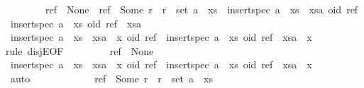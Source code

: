 \begin{isabellebody}
\ \ \ \ \ \ \ {}{\isacharcolon}\ {\isachardoublequoteopen}{\isacharparenleft}ref\ {\isacharequal}\ None\ {\isasymor}\ ref\ {\isacharequal}\ Some\ r\ {\isasymand}\ r\ {\isasymin}\ set\ {\isacharparenleft}a\ {\isacharhash}\ xs{\isacharparenright}\ {\isasymLongrightarrow}\ insert{\isacharunderscore}spec\ {\isacharparenleft}{\isacharparenleft}a\ {\isacharhash}\ xs{\isacharparenright}\ {\isacharat}\ xsa{\isacharparenright}\ {\isacharparenleft}oid{\isacharcomma}\ ref{\isacharparenright}\ {\isacharequal}\ insert{\isacharunderscore}spec\ {\isacharparenleft}a\ {\isacharhash}\ xs{\isacharparenright}\ {\isacharparenleft}oid{\isacharcomma}\ ref{\isacharparenright}\ {\isacharat}\ xsa{\isacharparenright}{\isachardoublequoteclose}\isanewline
\ \ \ \ \isamarkupfalse%
\ {\isachardoublequoteopen}insert{\isacharunderscore}spec\ {\isacharparenleft}{\isacharparenleft}a\ {\isacharhash}\ xs{\isacharparenright}\ {\isacharat}\ xsa\ {\isacharat}\ {\isacharbrackleft}x{\isacharbrackright}{\isacharparenright}\ {\isacharparenleft}oid{\isacharcomma}\ ref{\isacharparenright}\ {\isacharequal}\ insert{\isacharunderscore}spec\ {\isacharparenleft}a\ {\isacharhash}\ xs{\isacharparenright}\ {\isacharparenleft}oid{\isacharcomma}\ ref{\isacharparenright}\ {\isacharat}\ xsa\ {\isacharat}\ {\isacharbrackleft}x{\isacharbrackright}{\isachardoublequoteclose}\isanewline
\ \ \ \ \isamarkupfalse%
{\isacharparenleft}rule\ disjE{\isacharbrackleft}OF\ {}{\isacharbrackright}{\isacharparenright}\isanewline
\ \ \ \ \ \ \isamarkupfalse%
\ {\isachardoublequoteopen}ref\ {\isacharequal}\ None{\isachardoublequoteclose}\isanewline
\ \ \ \ \ \ \isamarkupfalse%
\ {\isachardoublequoteopen}insert{\isacharunderscore}spec\ {\isacharparenleft}{\isacharparenleft}a\ {\isacharhash}\ xs{\isacharparenright}\ {\isacharat}\ xsa\ {\isacharat}\ {\isacharbrackleft}x{\isacharbrackright}{\isacharparenright}\ {\isacharparenleft}oid{\isacharcomma}\ ref{\isacharparenright}\ {\isacharequal}\ insert{\isacharunderscore}spec\ {\isacharparenleft}a\ {\isacharhash}\ xs{\isacharparenright}\ {\isacharparenleft}oid{\isacharcomma}\ ref{\isacharparenright}\ {\isacharat}\ xsa\ {\isacharat}\ {\isacharbrackleft}x{\isacharbrackright}{\isachardoublequoteclose}\isanewline
\ \ \ \ \ \ \ \ \isamarkupfalse%
\ auto\isanewline
\ \ \ \ \isamarkupfalse%
\isanewline
\ \ \ \ \ \ \isamarkupfalse%
\ {\isachardoublequoteopen}ref\ {\isacharequal}\ Some\ r\ {\isasymand}\ r\ {\isasymin}\ set\ {\isacharparenleft}a\ {\isacharhash}\ xs{\isacharparenright}{\isachardoublequoteclose}\isanewline

\end{isabellebody}
